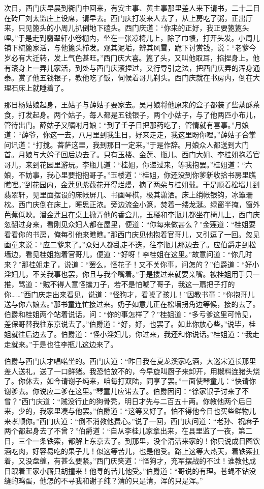 次日，西门庆早晨到衙门中回来，有安主事、黄主事那里差人来下请书，二十二日在砖厂刘太监庄上设席，请早去。西门庆打发来人去了，从上房吃了粥，正出厅来，只见篦头的小周儿扒倒地下磕头。西门庆道：“你来的正好，我正要篦篦头哩。”于是走到翡翠轩小卷棚内，坐在一张凉椅儿上，除了巾帻，打开头发。小周儿铺下梳篦家活，与他篦头栉发。观其泥垢，辨其风雪，跪下讨赏钱，说：“老爹今岁必有大迁转，发上气色甚旺。”西门庆大喜。篦了头，又叫他取耳，掐捏身上。他有滚身上一弄儿家活，到处与西门庆滚捏过，又行导引之法，把西门庆弄的浑身通泰。赏了他五钱银子，教他吃了饭，伺候着哥儿剃头。西门庆就在书房内，倒在大理石床上就睡着了。

那日杨姑娘起身，王姑子与薛姑子要家去。吴月娘将他原来的盒子都装了些蒸酥茶食，打发起身。两个姑子，每人都是五钱银子，两个小姑子，与了他两匹小布儿，管待出门。薛姑子又嘱咐月娘：“到了壬子日把那药吃了，管情就有喜事。”月娘道：“薛爷，你这一去，八月里到我生日，好来走走，我这里盼你哩。”薛姑子合掌问讯道：“打搅。菩萨这里，我到那日一定来。”于是作辞。月娘众人都送到大门首。月娘与大妗子回后边去了。只有玉楼、金莲、瓶儿、西门大姐、李桂姐抱着官哥儿，来到花园里游玩。李瓶儿道：“桂姐，你递过来，等我抱罢。”桂姐道：“六娘，不妨事，我心里要抱抱哥子。”玉楼道：“桂姐，你还没到你爹新收拾书房里瞧瞧哩。”到花园内，金莲见紫薇花开得烂熳，摘了两朵与桂姐戴。于是顺着松墙儿到翡翠轩，见里面摆设的床帐屏几、书画琴棋，极其潇洒。床上绡帐银钩，冰簟珊枕。西门庆倒在床上，睡思正浓。旁边流金小篆，焚着一缕龙涎。绿窗半掩，窗外芭蕉低映。潘金莲且在桌上掀弄他的香盒儿，玉楼和李瓶儿都坐在椅儿上，西门庆忽翻过身来，看刚见众妇人都在屋里，便道：“你每来做甚么？”金莲道：“桂姐要看看你的书房，俺每引他来瞧瞧。”那西门庆见他抱着官哥儿，又引逗了一回。忽见画童来说：“应二爹来了。”众妇人都乱走不迭，往李瓶儿那边去了。应伯爵走到松墙边，看见桂姐抱着官哥儿，便道：“好呀！李桂姐在这里。”故意问道：“你几时来？”那桂姐走了，说道：“罢么，怪花子！又不关你事，问怎的？”伯爵道：“好小淫妇儿，不关我事也罢，你且与我个嘴着。”于是搂过来就要亲嘴。被桂姐用手只一推，骂道：“贼不得人意怪攮刀子，若不是怕唬了哥子，我这一扇把子打的你……”西门庆走出来看见，说道：“怪狗才，看唬了孩儿！”因教书童：“你抱哥儿送与你六娘去。”那书童连忙接过来。奶子如意儿正在松墙拐角边等候，接的去了。伯爵和桂姐两个站着说话，问：“你的事怎样了？”桂姐道：“多亏爹这里可怜见，差保哥替我往东京说去了。”伯爵道：“好，好，也罢了。如此你放心些。”说毕，桂姐就往后边去了。伯爵道：“怪小淫妇儿，你过来，我还和你说话。”桂姐道：“我走走就来。”于是也往李瓶儿这边来了。

伯爵与西门庆才唱喏坐的。西门庆道：“昨日我在夏龙溪家吃酒，大巡宋道长那里差人送礼，送了一口鲜猪。我恐怕放不的，今早旋叫厨子来卸开，用椒料连猪头烧了。你休去，如今请谢子纯来，咱每打双陆，同享了罢。”一面使琴童儿：“快请你谢爹去。你说应二爹在这里。”琴童儿应诺去了。伯爵因问：“徐家银子讨来了不曾？”西门庆道：“贼没行止的狗骨秃，明日才先与二百五十两。你教他两个后日来，少的，我家里凑与他罢。”伯爵道：“这等又好了。怕不得他今日也买些鲜物儿来孝顺你。”西门庆道：“倒不消教他费心。”说了一回，西门庆问道：“老孙、祝麻子两个都起身去了不曾？”伯爵道：“自从李桂儿家拿出来，在县里监了一夜，第二日，三个一条铁索，都解上东京去了。到那里，没个清洁来家的！你只说成日图饮酒吃肉，好容易吃的果子儿！似这等苦儿，也是他受。路上这等大热天，着铁索扛着，又没盘缠，有甚么要紧。”西门庆笑道：“怪狗才，充军摆战的不过！谁教他成日跟着王家小厮只胡撞来！他寻的苦儿他受。”伯爵道：“哥说的有理。苍蝇不钻没缝的鸡蛋，他怎的不寻我和谢子纯？清的只是清，浑的只是浑。”

